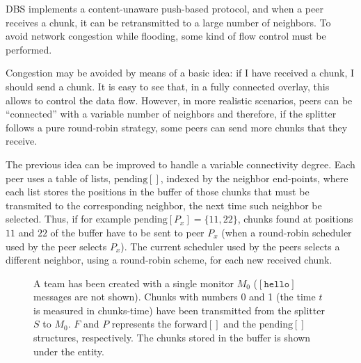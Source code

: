 
\label{sec:chunk_flooding}

\begin{comment}
\begin{figure*}
  \imgw{300}{graphics/peer_chunk_flooding.svg}
  \caption{Chunk flooding at peers.\label{fig:peer_chunk_flooding}}
\end{figure*}
\end{comment}

DBS implements a content-unaware push-based protocol, and when a
peer receives a chunk, it can be retransmitted to a large number of
neighbors. To avoid network congestion while flooding, some kind of
flow control must be performed.


Congestion may be avoided by means of a basic idea: \textsf{if I have
  received a chunk, I should send a chunk}. It is easy to see that, in
a fully connected overlay, this allows to control the data
flow. However, in more realistic scenarios, peers can be ``connected''
with a variable number of neighbors and therefore, if the splitter
follows a pure round-robin strategy, some peers can send more chunks
that they receive.

The previous idea can be improved to handle a variable connectivity
degree. Each peer uses a table of lists, $\text{pending}[]$, indexed
by the neighbor end-points, where each list stores the positions in
the buffer of those chunks that must be transmited to the
corresponding neighbor, the next time such neighbor be selected. Thus,
if for example $\text{pending}[P_x]=\{11,22\}$, chunks found at
positions $11$ and $22$ of the buffer have to be sent to peer $P_x$
(when a round-robin scheduler used by the peer selects $P_x$). The
current scheduler used by the peers selects a different neighbor,
using a round-robin scheme, for each new received chunk.

\begin{figure}
   \caption{A team has been created with a
    single monitor $M_0$ ($[\mathtt{hello}]$ messages are not
    shown). Chunks with numbers 0 and 1 (the time $t$ is measured in
    chunks-time) have been transmitted from the splitter $S$ to
    $M_0$. $F$ and $P$ represents the $\text{forward}[]$ and the
    $\text{pending}[]$ structures, respectively. The chunks stored in
    the buffer is shown under the entity.\label{fig:team_0}}
\end{figure}

